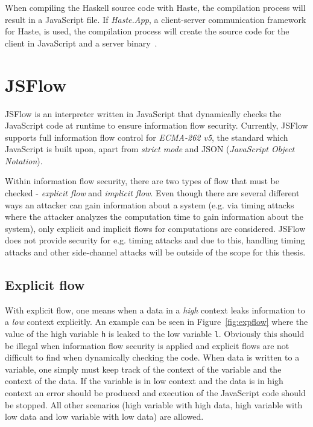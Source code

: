 When compiling the Haskell source code with Haste, the compilation process will result in a JavaScript file. If \emph{Haste.App}, a client-server communication framework for Haste, is used, the compilation process will create the source code for the client in JavaScript and a server binary~\cite{haste-symposium}.

\section{JSFlow}
JSFlow is an interpreter written in JavaScript that dynamically checks the JavaScript code at runtime to ensure information flow security. Currently, JSFlow supports full information flow control for \emph{ECMA-262 v5}, the standard which JavaScript is built upon, apart from \emph{strict mode} and JSON (\emph{JavaScript Object Notation}).

Within information flow security, there are two types of flow that must be checked - \emph{explicit flow} and \emph{implicit flow}. Even though there are several different ways an attacker can gain information about a system (e.g. via timing attacks where the attacker analyzes the computation time to gain information about the system), only explicit and implicit flows for computations are considered. JSFlow does not provide security for e.g. timing attacks and due to this, handling timing attacks and other side-channel attacks will be outside of the scope for this thesis.
\subsection{Explicit flow}
With explicit flow, one means when a data in a \emph{high} context leaks information to a \emph{low} context explicitly. An example can be seen in Figure~\ref{fig:expflow} where the value of the high variable {\tt h} is leaked to the low variable {\tt l}. Obviously this should be illegal when information flow security is applied and explicit flows are not difficult to find when dynamically checking the code. When data is written to a variable, one simply must keep track of the context of the variable and the context of the data. If the variable is in low context and the data is in high context an error should be produced and execution of the JavaScript code should be stopped. All other scenarios (high variable with high data, high variable with low data and low variable with low data) are allowed.
